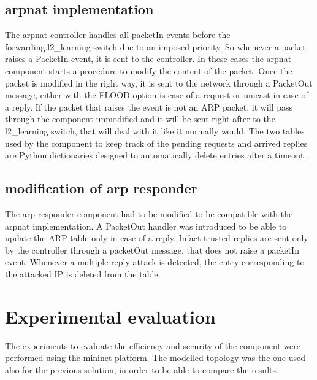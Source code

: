 \documentclass[11pt]{article}
\begin{document}
\subsection{arpnat implementation}
The arpnat controller handles all packetIn events before the forwarding.l2\_learning switch due to an imposed priority.
So whenever a packet raises a PacketIn event, it is sent to the controller. In these cases the arpnat component starts a procedure to modify the content of the packet. Once the packet is modified in the right way, it is sent to the network through a PacketOut message, either with the FLOOD option is case of a request or unicast in case of a reply.
If the packet that raises the event is not an ARP packet, it will pass through the component unmodified and it will be sent right after to the l2\_learning switch, that will deal with it like it normally would.
The two tables used by the component to keep track of the pending requests and arrived replies are Python dictionaries designed to automatically delete entries after a timeout.
\subsection{modification of arp responder}
The arp responder component had to be modified to be compatible with the arpnat implementation. A PacketOut handler was introduced to be able to update the ARP table only in case of a reply. Infact trusted replies are sent only by the controller through a packetOut message, that does not raise a packetIn event.
Whenever a multiple reply attack is detected, the entry corresponding to the attacked IP is deleted from the table.
\section{Experimental evaluation}
The experiments to evaluate the efficiency and security of the component were performed using the mininet platform. The modelled topology was the one used also for the previous solution, in order to be able to compare the results.
\\
\end{document}
